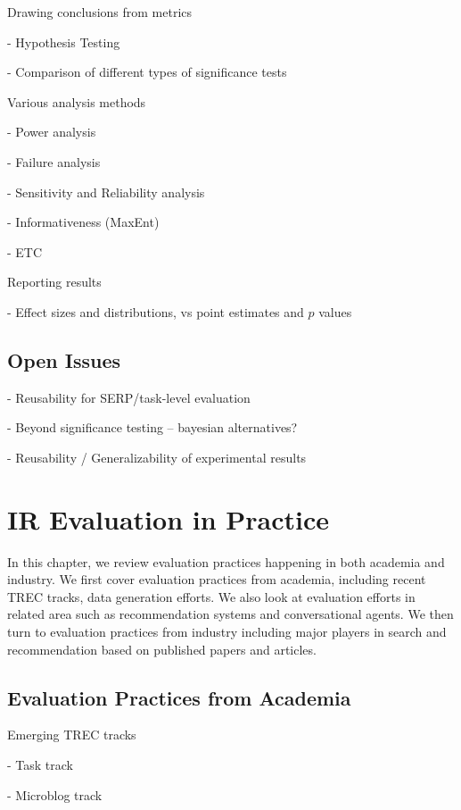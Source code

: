 \documentclass[openany]{now} %
\newcommand{\newpar}{\bigskip\noindent}
\begin{document}
Drawing conclusions from metrics 

- Hypothesis Testing \cite{Dincer:2014}

- Comparison of different types of significance tests \cite{SmuckerAC09}

\newpar
Various analysis methods

- Power analysis \cite{Sakai:2014}

- Failure analysis

- Sensitivity and Reliability analysis \cite{Urbano:2013} 

- Informativeness (MaxEnt) \cite{AslamYP05}

- ETC \cite{Bron:2013} \cite{Boytsov:2013}  \cite{Robertson:2012}

\newpar
Reporting results

- Effect sizes and distributions, vs point estimates and $p$ values

\section{Open Issues}

- Reusability for SERP/task-level evaluation

- Beyond significance testing -- bayesian alternatives?

- Reusability / Generalizability of experimental results


\chapter{IR Evaluation in Practice}

In this chapter, we review evaluation practices happening in both academia and industry. We first cover evaluation practices from academia, including recent TREC tracks, data generation efforts. We also look at evaluation efforts in related area such as recommendation systems and conversational agents. We then turn to evaluation practices from industry including major players in search and recommendation based on published papers and articles.

\section{Evaluation Practices from Academia}

Emerging TREC tracks

- Task track

- Microblog track
\end{document}
